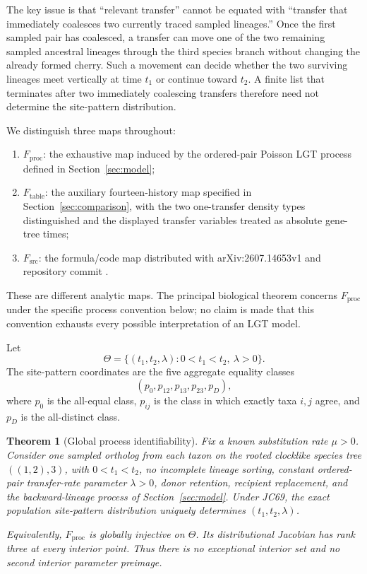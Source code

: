 \documentclass[11pt]{article}
\newtheorem{theorem}{Theorem}[section]
\newcommand{\Thetao}{\Theta}
\newcommand{\Proc}{F_{\mathrm{proc}}}
\newcommand{\Table}{F_{\mathrm{table}}}
\newcommand{\Src}{F_{\mathrm{src}}}
\begin{document}
The key issue is that ``relevant transfer'' cannot be equated with ``transfer that immediately coalesces two currently traced sampled lineages.''  Once the first sampled pair has coalesced, a transfer can move one of the two remaining sampled ancestral lineages through the third species branch without changing the already formed cherry.  Such a movement can decide whether the two surviving lineages meet vertically at time $t_1$ or continue toward $t_2$.  A finite list that terminates after two immediately coalescing transfers therefore need not determine the site-pattern distribution.

We distinguish three maps throughout:
\begin{enumerate}[label=\textbf{M\arabic*.}]
\item $\Proc$: the exhaustive map induced by the ordered-pair Poisson LGT process defined in Section~\ref{sec:model};
\item $\Table$: the auxiliary fourteen-history map specified in Section~\ref{sec:comparison}, with the two one-transfer density types distinguished and the displayed transfer variables treated as absolute gene-tree times;
\item $\Src$: the formula/code map distributed with arXiv:2607.14653v1 and repository commit .
\end{enumerate}
These are different analytic maps.  The principal biological theorem concerns $\Proc$ under the specific process convention below; no claim is made that this convention exhausts every possible interpretation of an LGT model.

Let
\[
\Thetao=\{(t_1,t_2,\lambda):0<t_1<t_2,\ \lambda>0\}.
\]
The site-pattern coordinates are the five aggregate equality classes
\[
(p_0,p_{12},p_{13},p_{23},p_D),
\]
where $p_0$ is the all-equal class, $p_{ij}$ is the class in which exactly taxa $i,j$ agree, and $p_D$ is the all-distinct class.

\begin{theorem}[Global process identifiability]\label{thm:primary}
Fix a known substitution rate $\mu>0$.  Consider one sampled ortholog from each taxon on the rooted clocklike species tree $((1,2),3)$, with $0<t_1<t_2$, no incomplete lineage sorting, constant ordered-pair transfer-rate parameter $\lambda>0$, donor retention, recipient replacement, and the backward-lineage process of Section~\ref{sec:model}.  Under JC69, the exact population site-pattern distribution uniquely determines $(t_1,t_2,\lambda)$.

Equivalently, $\Proc$ is globally injective on $\Thetao$.  Its distributional Jacobian has rank three at every interior point.  Thus there is no exceptional interior set and no second interior parameter preimage.
\end{theorem}
\end{document}
